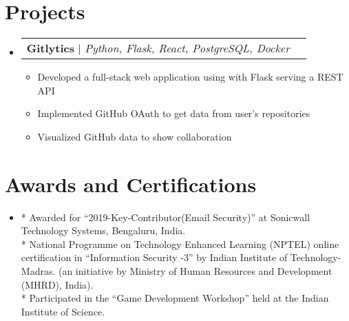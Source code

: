 \documentclass[letterpaper,11pt]{article}
\makeatletter
\newcommand{\resumeItem}[1]{
  \item\small{
    {#1 \vspace{-2pt}}
  }
}
\newcommand{\resumeProjectHeading}[2]{
    \item
    \begin{tabular*}{0.97\textwidth}{l@{\extracolsep{\fill}}r}
      \small#1 & #2 \\
    \end{tabular*}\vspace{-7pt}
}
\newcommand{\resumeSubHeadingListStart}{\begin{itemize}[leftmargin=0.15in, label={}]}
\newcommand{\resumeSubHeadingListEnd}{\end{itemize}}
\newcommand{\resumeItemListStart}{\begin{itemize}}
\newcommand{\resumeItemListEnd}{\end{itemize}\vspace{-5pt}}
\makeatother
\begin{document}
\section{Projects}
    \resumeSubHeadingListStart
      \resumeProjectHeading
          {\textbf{Gitlytics} $|$ \emph{Python, Flask, React, PostgreSQL, Docker}}{}
          \resumeItemListStart
            \resumeItem{Developed a full-stack web application using with Flask serving a REST API}
            \resumeItem{Implemented GitHub OAuth to get data from user’s repositories}
            \resumeItem{Visualized GitHub data to show collaboration}
          \resumeItemListEnd
    \resumeSubHeadingListEnd

\section{Awards and Certifications}
 \begin{itemize}[leftmargin=0.15in, label={}]
  \item{* Awarded for “2019-Key-Contributor(Email Security)” at Sonicwall Technology Systems, Bengaluru, India.}\\
   {* National Programme on Technology Enhanced Learning (NPTEL) online certification in “Information Security -3” by 
Indian Institute of Technology-Madras. (an initiative by Ministry of Human Resources and Development (MHRD), India).}\\{* Participated in the “Game Development Workshop” held at the Indian Institute of Science.}
 \end{itemize}
\end{document}
